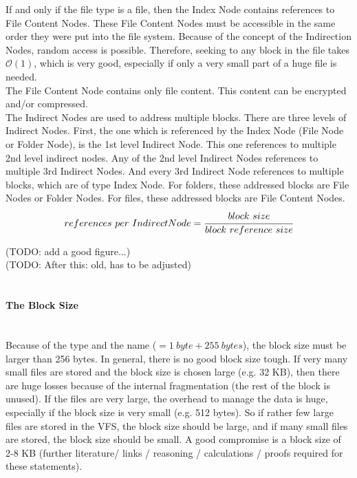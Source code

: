 \documentclass[JCDReport.tex]{subfiles}
\begin{document}
If and only if the file type is a file, then the Index Node contains references to File Content Nodes. These File Content Nodes must be accessible in the same order they were put into the file system. Because of the concept of the Indirection Nodes, random access is possible. Therefore, seeking to any block in the file takes $\mathcal{O}(1)$, which is very good, especially if only a very small part of a huge file is needed.\\

The File Content Node contains only file content. This content can be encrypted and/or compressed.\\

The Indirect Nodes are used to address multiple blocks. There are three levels of Indirect Nodes. First, the one which is referenced by the Index Node (File Node or Folder Node), is the 1st level Indirect Node. This one references to multiple 2nd level indirect nodes. Any of the 2nd level Indirect Nodes references to multiple 3rd Indirect Nodes. And every 3rd Indirect Node references to multiple blocks, which are of type Index Node. For folders, these addressed blocks are File Nodes or Folder Nodes. For files, these addressed blocks are File Content Nodes.\\

$$references\ per\ Indirect Node = \cfrac{block\ size}{block\ reference\ size}$$



(TODO: add a good figure...)\\

(TODO: After this: old, has to be adjusted)\\
\\




\paragraph{The Block Size} ~\\

\noindent Because of the type and the name ($ = 1\ byte + 255\ bytes$), the block size must be larger than 256 bytes. In general, there is no good block size tough. If very many small files are stored and the block size is chosen  large (e.g. 32 KB), then there are huge losses because of the internal fragmentation (the rest of the block is unused). If the files are very large, the overhead to manage the data is huge, especially if the block size is very small (e.g. 512 bytes). So if rather few large files are stored in the VFS, the block size should be large, and if many small files are stored, the block size should be small. A good compromise is a block size of 2-8 KB (further literature/ links / reasoning / calculations / proofs required for these statements).
\end{document}
